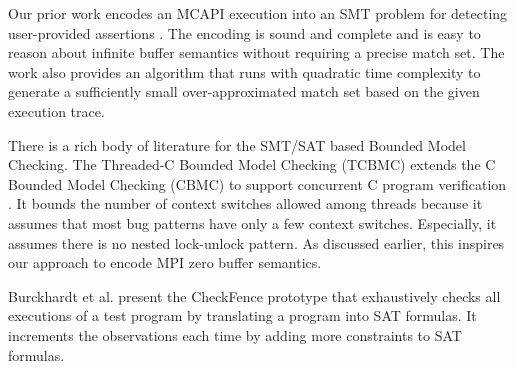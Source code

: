 Our prior work encodes an MCAPI execution into an SMT problem for detecting user-provided assertions \cite{DBLP:conf/kbse/HuangMM13}. The encoding is sound and complete and is easy to reason about infinite buffer semantics without requiring a precise match set. The work also provides an algorithm that runs with quadratic time complexity to generate a sufficiently small over-approximated match set based on the given execution trace. 

There is a rich body of literature for the SMT/SAT based Bounded Model Checking. 
The Threaded-C Bounded Model Checking (TCBMC) extends the C Bounded Model Checking (CBMC) \cite{DBLP:conf/tacas/ClarkeKL04,DBLP:conf/dac/ClarkeKY03} to support concurrent C program verification \cite{DBLP:conf/cav/RabinovitzG05}. It bounds the number of context switches allowed among threads because it assumes that most bug patterns have only a few context switches. Especially, it assumes there is no nested lock-unlock pattern. As discussed earlier, this inspires our approach to encode MPI zero buffer semantics.

Burckhardt et al. present the CheckFence prototype \cite{DBLP:conf/pldi/BurckhardtAM07} that exhaustively checks all executions of a test program by translating a program into SAT formulas. It increments the observations each time by adding more constraints to SAT formulas. 
